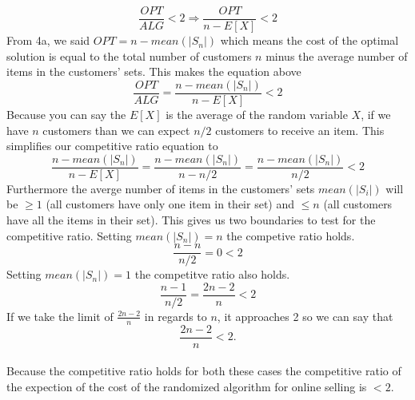 \documentclass[12pt]{article}
\begin{document}
\begin{enumerate}
\begin{enumerate}
      $$
      \frac{OPT}{ALG} < 2 \Longrightarrow \frac{OPT}{n-E[X]} < 2
      $$
      From 4a, we said $OPT = n-mean(|S_n|)$ which means the cost of the optimal
      solution is equal to the total number of customers $n$ minus the average
      number of items in the customers' sets.  This makes the equation above
      $$
      \frac{OPT}{ALG} = \frac{n-mean(|S_n|)}{n-E[X]} < 2
      $$
      Because you can say the $E[X]$ is the average of the random variable $X$,
      if we have $n$ customers than we can expect $n/2$ customers to receive an item.  This simplifies
      our competitive ratio equation to 
      $$
      \frac{n-mean(|S_n|)}{n-E[X]} = \frac{n-mean(|S_n|)}{n-n/2} =
      \frac{n-mean(|S_n|)}{n/2} < 2 
      $$
      Furthermore the averge number of items in the customers' sets
      $mean(|S_i|)$ will be $\ge 1$ (all customers have only one item in their
      set) and $\le n$ (all customers have all the items in their set).
      This gives us two boundaries to test for the competitive ratio.  Setting $mean(|S_n|) = n$ the competive ratio holds.
      $$
      \frac{n-n}{n/2} = 0 < 2
      $$
      Setting $mean(|S_n|) = 1$ the competitve ratio also holds.
      $$
      \frac{n-1}{n/2} = \frac{2n-2}{n} < 2
      $$
      If we take the limit of $\frac{2n-2}{n}$ in regards to $n$, it approaches
      2 so we can say that 
      $$
      \frac{2n-2}{n} < 2.
      $$
      \\Because the competitive ratio holds for both these cases the
      competitive ratio of the expection of the cost of the randomized algorithm
      for online selling is $< 2$.
    \end{enumerate}
    

\end{enumerate}
\end{document}
